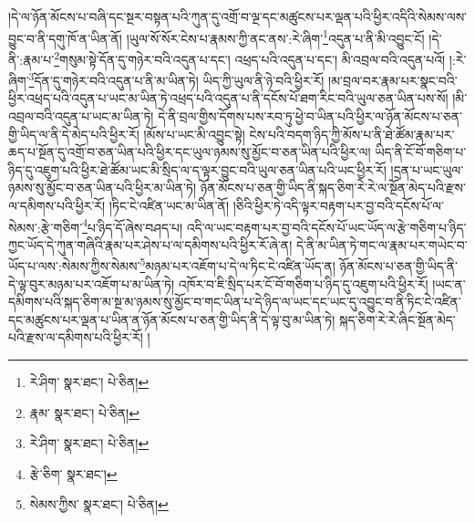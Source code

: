 །དེ་ལ་ཉོན་མོངས་པ་བཞི་དང་སྔར་བསྟན་པའི་ཀུན་དུ་འགྲོ་བ་ལྔ་དང་མཚུངས་པར་ལྡན་པའི་ཕྱིར་འདིའི་སེམས་ལས་བྱུང་བ་ནི་དགུ་ཁོ་ན་ཡིན་ནོ། །ཡུལ་སོ་སོར་ངེས་པ་རྣམས་ཀྱི་ནང་ནས་:རེ་ཞིག་\footnote{རེ་ཤིག་  སྣར་ཐང་།  པེ་ཅིན། }འདུན་པ་ནི་མི་འབྱུང་ངོ། །དེ་ནི་:རྣམ་པ་\footnote{རྣམ་  སྣར་ཐང་།  པེ་ཅིན། }གསུམ་སྟེ་དོན་དུ་གཉེར་བའི་འདུན་པ་དང་། འཕྲད་པའི་འདུན་པ་དང་། མི་འབྲལ་བའི་འདུན་པའོ། །:རེ་ཞིག་\footnote{རེ་ཤིག་  སྣར་ཐང་།  པེ་ཅིན། }དོན་དུ་གཉེར་བའི་འདུན་པ་ནི་མ་ཡིན་ཏེ། ཡིད་ཀྱི་ཡུལ་ནི་ཉེ་བའི་ཕྱིར་རོ། །མ་བྲལ་བར་རྣམ་པར་སྣང་བའི་ཕྱིར་འཕྲད་པའི་འདུན་པ་ཡང་མ་ཡིན་ཏེ་འཕྲད་པའི་འདུན་པ་ནི་དངོས་པོ་ཐག་རིང་བའི་ཡུལ་ཅན་ཡིན་པས་སོ། །མི་འབྲལ་བའི་འདུན་པ་ཡང་མ་ཡིན་ཏེ། དེ་ནི་བྲལ་གྱིས་དོགས་པས་རབ་ཏུ་ཕྱེ་བ་ཡིན་པའི་ཕྱིར་ལ་ཉོན་མོངས་པ་ཅན་གྱི་ཡིད་ལ་ནི་དེ་མེད་པའི་ཕྱིར་རོ། །མོས་པ་ཡང་མི་འབྱུང་སྟེ། ངེས་པའི་བདག་ཉིད་ཀྱི་མོས་པ་ནི་ཐེ་ཚོམ་རྣམ་པར་ཆད་པ་སྔོན་དུ་འགྲོ་བ་ཅན་ཡིན་པའི་ཕྱིར་དང་ཡུལ་ཉམས་སུ་མྱོང་བ་ཅན་ཡིན་པའི་ཕྱིར་ལ། ཡིད་ནི་ངོ་བོ་གཅིག་པ་ཉིད་དུ་འཇུག་པའི་ཕྱིར་ཐེ་ཚོམ་ཡང་མི་སྲིད་ལ་ད་ལྟར་བྱུང་བའི་ཡུལ་ཅན་ཡིན་པའི་ཡང་ཕྱིར་རོ། །དྲན་པ་ཡང་ཡུལ་ཉམས་སུ་མྱོང་བ་ཅན་ཡིན་པའི་ཕྱིར་མ་ཡིན་ཏེ། ཉོན་མོངས་པ་ཅན་གྱི་ཡིད་ནི་སྐད་ཅིག་རེ་རེ་ལ་སྔོན་མེད་པའི་རྫས་ལ་དམིགས་པའི་ཕྱིར་རོ། །ཏིང་ངེ་འཛིན་ཡང་མ་ཡིན་ནོ། །ཅིའི་ཕྱིར་ཏེ་འདི་ལྟར་བརྟག་པར་བྱ་བའི་དངོས་པོ་ལ་སེམས་:རྩེ་གཅིག་\footnote{རྩེ་ཅིག་  སྣར་ཐང་། }པ་ཉིད་དོ་ཞེས་བཤད་པ། འདི་ལ་ཡང་བརྟག་པར་བྱ་བའི་དངོས་པོ་ཡང་ཡོད་ལ་རྩེ་གཅིག་པ་ཉིད་ཀྱང་ཡོད་དེ་ཀུན་གཞིའི་རྣམ་པར་ཤེས་པ་ལ་དམིགས་པའི་ཕྱིར་རོ་ཞེ་ན། དེ་ནི་མ་ཡིན་ཏེ་གང་ལ་རྣམ་པར་གཡེང་བ་ཡོད་པ་ལས་:སེམས་ཀྱིས་སེམས་\footnote{སེམས་ཀྱིས་  སྣར་ཐང་།  པེ་ཅིན། }མཉམ་པར་འཇོག་པ་དེ་ལ་ཏིང་ངེ་འཛིན་ཡོད་ན། ཉོན་མོངས་པ་ཅན་གྱི་ཡིད་ནི་དེ་ལྟ་བུར་མཉམ་པར་འཇོག་པ་མ་ཡིན་ཏེ། འཁོར་བ་ཇི་སྲིད་པར་ངོ་བོ་གཅིག་པ་ཉིད་དུ་འཇུག་པའི་ཕྱིར་རོ། །ཡང་ན་དམིགས་པའི་སྐད་ཅིག་མ་སྔ་མ་ཉམས་སུ་མྱོང་བ་གང་ཡིན་པ་དེ་ཉིད་ལ་ཡང་དང་ཡང་དུ་འབྱུང་བ་ནི་ཏིང་ངེ་འཛིན་དང་མཚུངས་པར་ལྡན་པ་ཡིན་ན་ཉོན་མོངས་པ་ཅན་གྱི་ཡིད་ནི་དེ་ལྟ་བུ་མ་ཡིན་ཏེ། སྐད་ཅིག་རེ་རེ་ཞིང་སྔོན་མེད་པའི་རྫས་ལ་དམིགས་པའི་ཕྱིར་རོ། །
